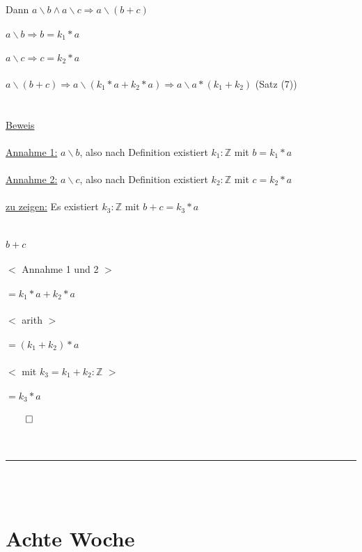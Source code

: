 \documentclass[18pt,a4paper]{article}
\newcommand{\tab}{\hspace*{2em}}
\begin{document}
\\
Dann \: $a\backslash b \wedge a\backslash c \Rightarrow a\backslash (b+c)$\\
\\
$a\backslash b \Rightarrow b = k_1 * a$\\
\\
$a\backslash c \Rightarrow c = k_2 * a$\\
\\
$a\backslash (b+c) \Rightarrow a\backslash (k_1 * a +  k_2 * a) \Rightarrow a\backslash a*(k_1+k_2)$ \checkmark    (Satz (7)) \\
\\
\\
\uline{Beweis}\\
\\
\uline{Annahme 1:} $a\backslash b$, also nach Definition existiert $k_1 : \mathbb{Z}$ mit $b = k_1 *a$\\
\\
\uline{Annahme 2:} $a\backslash c$, also nach Definition existiert $k_2 : \mathbb{Z}$ mit $c = k_2 *a$\\
\\
\uline{zu zeigen:} Es existiert $k_3 : \mathbb{Z}$ mit $b+c = k_3 * a$\\
\\
\\
$b+c$\\
\\
\tab $<$ Annahme 1 und 2 $>$\\
\\
$= k_1 * a + k_2 * a$\\
\\
\tab $<$ arith $>$\\
\\
$= (k_1 + k_2) *a$\\
\\
\tab $<$ mit $k_3 = k_1 + k_2 : \mathbb{Z}$ $>$\\
\\
$= k_3 * a$\\
\\
$\qed$\\
\\
\\
\rule{\textwidth}{0.4mm}\\
\\

\section{Achte Woche}
\end{document}
